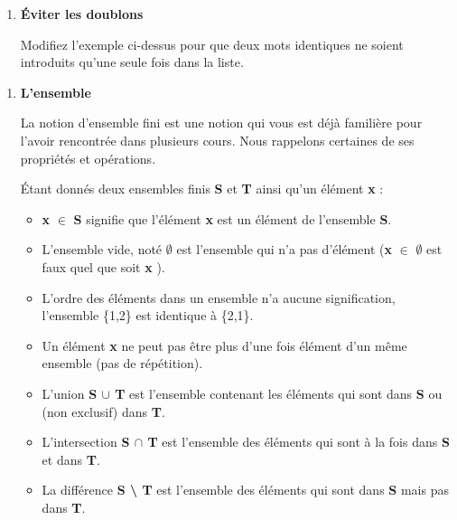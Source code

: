 	\liststyleExercice
	\setcounter{saveenum}{\value{enumi}}
	\begin{enumerate}
	\setcounter{enumi}{\value{saveenum}}
	\item {\sffamily\bfseries
	Éviter les doublons}
	
			Modifiez l’exemple ci-dessus pour que deux mots identiques ne soient
			introduits qu’une seule fois dans la liste.
	\end{enumerate}

	\liststyleExercice
	\setcounter{saveenum}{\value{enumi}}
	\begin{enumerate}
	\setcounter{enumi}{\value{saveenum}}
		\item {\sffamily\bfseries
		L'ensemble}
		
			La notion d’ensemble fini est une notion qui vous est déjà 
			familière pour l’avoir rencontrée dans plusieurs cours. Nous rappelons
			certaines de ses propriétés et opérations. 
			
			\bigskip
			
			Étant donnés deux ensembles
			finis \textbf{S} et \textbf{T} ainsi qu’un élément \textbf{x} :

			\liststyleListv
			\begin{itemize}
			\item 
				\textbf{x} {${\in}$} \textbf{S} signifie que l’élément \textbf{x}
				est un élément de l’ensemble \textbf{S}.
			\item 
				L’ensemble vide, noté \textbf{${\emptyset}$} 
				est l’ensemble qui n’a pas d’élément 
				(\textbf{x} {${\in}$} \textbf{${\emptyset}$} 
				est faux quel que soit \textbf{x} ).
			\item 
				L’ordre des éléments dans un ensemble n’a
				aucune signification, l’ensemble \{1,2\} est
				identique à \{2,1\}.
			\item 
				Un élément \textbf{x} ne peut
				pas être plus d’une fois élément d’un même ensemble 
				(pas de répétition).
			\item 
				L’union \textbf{S ${\cup}$ T} 
				est l’ensemble contenant les éléments qui sont dans 
				\textbf{S} ou (non exclusif) dans \textbf{T}.
			\item 
				L’intersection \textbf{S ${\cap}$ T} 
				est l’ensemble des éléments qui sont à la fois 
				dans \textbf{S} et dans \textbf{T}.
			\item 
				La différence \textbf{S {\textbackslash} T} 
				est l’ensemble des éléments qui sont 
				dans \textbf{S} mais pas dans \textbf{T}.
			\end{itemize}
			

\end{enumerate}
